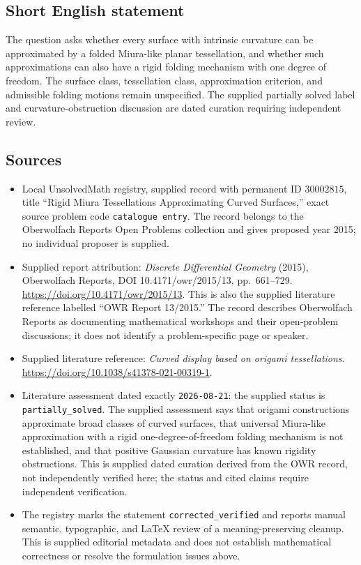 \documentclass[11pt]{article}
\begin{document}
\subsection{Short English statement}
The question asks whether every surface with intrinsic curvature can be approximated by a folded Miura-like planar tessellation, and whether such approximations can also have a rigid folding mechanism with one degree of freedom. The surface class, tessellation class, approximation criterion, and admissible folding motions remain unspecified. The supplied partially solved label and curvature-obstruction discussion are dated curation requiring independent review.
\subsection{Sources}
\begin{itemize}
\item Local UnsolvedMath registry, supplied record with permanent ID \(30002815\), title ``Rigid Miura Tessellations Approximating Curved Surfaces,'' exact source problem code \texttt{catalogue entry}. The record belongs to the Oberwolfach Reports Open Problems collection and gives proposed year 2015; no individual proposer is supplied.
\item Supplied report attribution: \emph{Discrete Differential Geometry} (2015), Oberwolfach Reports, DOI 10.4171/owr/2015/13, pp.\ 661--729. \url{https://doi.org/10.4171/owr/2015/13}. This is also the supplied literature reference labelled ``OWR Report 13/2015.'' The record describes Oberwolfach Reports as documenting mathematical workshops and their open-problem discussions; it does not identify a problem-specific page or speaker.
\item Supplied literature reference: \emph{Curved display based on origami tessellations}. \url{https://doi.org/10.1038/s41378-021-00319-1}.
\item Literature assessment dated exactly \texttt{2026-08-21}: the supplied status is \texttt{partially\_solved}. The supplied assessment says that origami constructions approximate broad classes of curved surfaces, that universal Miura-like approximation with a rigid one-degree-of-freedom folding mechanism is not established, and that positive Gaussian curvature has known rigidity obstructions. This is supplied dated curation derived from the OWR record, not independently verified here; the status and cited claims require independent verification.
\item The registry marks the statement \texttt{corrected\_verified} and reports manual semantic, typographic, and LaTeX review of a meaning-preserving cleanup. This is supplied editorial metadata and does not establish mathematical correctness or resolve the formulation issues above.
\end{itemize}
\end{document}
